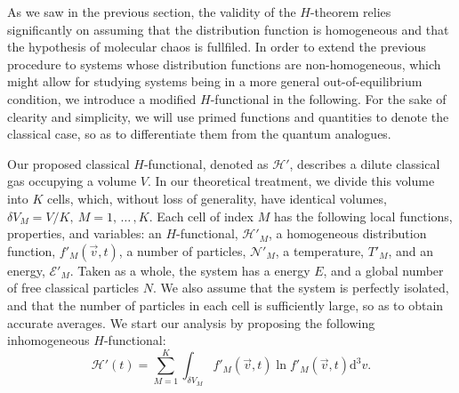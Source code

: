 As we saw in the previous section,
the validity of the $H$-theorem relies significantly on assuming
that the distribution function is homogeneous and that the hypothesis of
molecular chaos is fullfiled. In order to extend the previous procedure to systems whose
distribution functions are non-homogeneous, which might allow for studying systems
being in a more general out-of-equilibrium condition, we introduce a modified $H$-functional 
in the following. For the sake of clearity and simplicity, we will use primed functions
and quantities to denote the classical case, so as to differentiate them from the quantum
analogues.

Our proposed classical $H$-functional, denoted as $\mathcal{H}'$, describes a dilute classical
gas occupying a volume $V$. In our theoretical treatment, we divide this volume
into $K$ cells, which, without loss of generality,
have identical volumes, $\delta V_M = V/K,\ M=1,\,\dots\,,K$.
Each cell of index $M$ has the following local functions, properties, and variables:
an $H$-functional, $\mathcal{H}'_M$, a homogeneous distribution function, $f'_{M}(\vec{v},t)$,
a number of particles, $\mathcal{N}'_M$, a temperature, $T'_M$, and an
energy, $\mathcal{E}'_M$. Taken as a whole, the system has a
energy $E$, and a global number of free classical particles $N$. We also assume that the system is 
perfectly isolated, and that the number of particles
in each cell is sufficiently large, so as to obtain accurate averages.
We start our analysis by proposing the following inhomogeneous $H$-functional:
%
\begin{equation}\label{eq:cHdef}
   \mathcal{H}'(t)=\sum_{M=1}^{K}\int_{\delta V_M} f'_M(\vec{v},t) \ln f'_M(\vec{v},t)\mathrm{d}^3v.
\end{equation}
%


